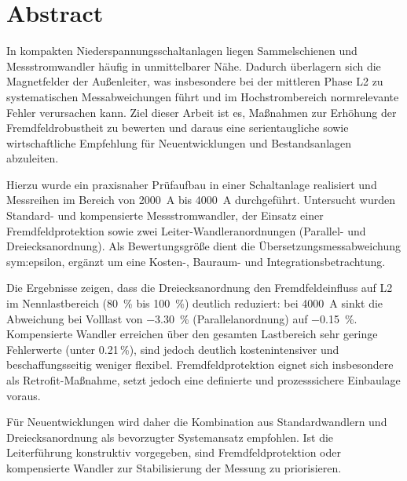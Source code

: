 
\section*{Abstract}

In kompakten Niederspannungsschaltanlagen liegen Sammelschienen und Messstromwandler häufig in unmittelbarer Nähe. Dadurch überlagern sich die Magnetfelder der Außenleiter, was insbesondere bei der mittleren Phase L2 zu systematischen Messabweichungen führt und im Hochstrombereich normrelevante Fehler verursachen kann. Ziel dieser Arbeit ist es, Maßnahmen zur Erhöhung der Fremdfeldrobustheit zu bewerten und daraus eine serientaugliche sowie wirtschaftliche Empfehlung für Neuentwicklungen und Bestandsanlagen abzuleiten.

Hierzu wurde ein praxisnaher Prüfaufbau in einer Schaltanlage realisiert und Messreihen im Bereich von \SI{2000}{A} bis \SI{4000}{A} durchgeführt. Untersucht wurden Standard- und kompensierte Messstromwandler, der Einsatz einer Fremdfeldprotektion sowie zwei Leiter-\/Wandleranordnungen (Parallel- und Dreiecksanordnung). Als Bewertungsgröße dient die Übersetzungsmessabweichung \gls{sym:epsilon}, ergänzt um eine Kosten-, Bauraum- und Integrationsbetrachtung.

Die Ergebnisse zeigen, dass die Dreiecksanordnung den Fremdfeldeinfluss auf L2 im Nennlastbereich (\SI{80}{\percent} bis \SI{100}{\percent}) deutlich reduziert: bei \SI{4000}{A} sinkt die Abweichung bei Volllast von \SI{-3,30}{\percent} (Parallelanordnung) auf \SI{-0,15}{\percent}. Kompensierte Wandler erreichen über den gesamten Lastbereich sehr geringe Fehlerwerte (unter \num{0,21}\,\%), sind jedoch deutlich kostenintensiver und beschaffungsseitig weniger flexibel. Fremdfeldprotektion eignet sich insbesondere als Retrofit-Maßnahme, setzt jedoch eine definierte und prozesssichere Einbaulage voraus.

Für Neuentwicklungen wird daher die Kombination aus Standardwandlern und Dreiecksanordnung als bevorzugter Systemansatz empfohlen. Ist die Leiterführung konstruktiv vorgegeben, sind Fremdfeldprotektion oder kompensierte Wandler zur Stabilisierung der Messung zu priorisieren.
